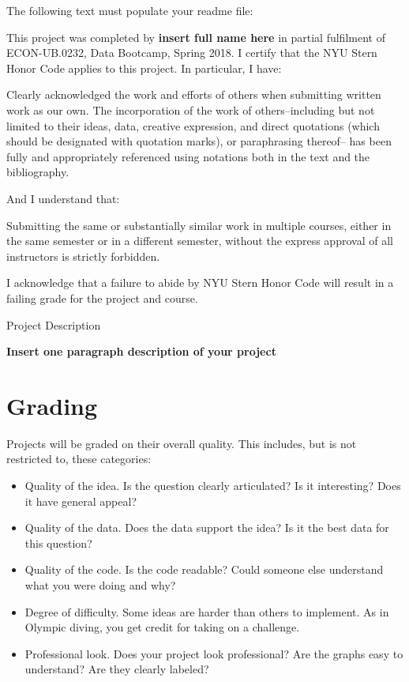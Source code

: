 The following text must populate your readme file:
\bigskip
\bigskip

This project was completed by \textbf{insert full name here} in partial fulfilment of  ECON-UB.0232, Data Bootcamp, Spring 2018. I certify that the NYU Stern Honor Code applies to this project. In particular, I have:

Clearly acknowledged the work and efforts of others when submitting written work as
our own. The incorporation of the work of others--including but not limited to their ideas,
data, creative expression, and direct quotations (which should be designated with quotation
marks), or paraphrasing thereof-- has been fully and appropriately referenced using notations
both in the text and the bibliography.

And I understand that:

Submitting the same or substantially similar work in multiple courses, either in the
same semester or in a different semester, without the express approval of all instructors is
strictly forbidden.

I acknowledge that a failure to abide by NYU Stern Honor Code will result in a failing grade for the project and course.

Project Description

\textbf{Insert one paragraph description of your project}

\newpage

\section*{Grading}

Projects will be graded on their overall quality.  This includes, but is not restricted to,
these categories:
%
\begin{itemize}
\item Quality of the idea.  Is the question clearly articulated?  Is it interesting?
Does it have general appeal?
\item Quality of the data.  Does the data support the idea?
Is it the best data for this question?
\item Quality of the code. Is the code readable? Could someone else understand what you were doing and why?
\item Degree of difficulty.  Some ideas are harder than others to implement.
As in Olympic diving, you get credit for taking on a challenge.
\item Professional look.  Does your project look professional?  Are the graphs
easy to understand?  Are they clearly labeled?
\end{itemize}


%



%


